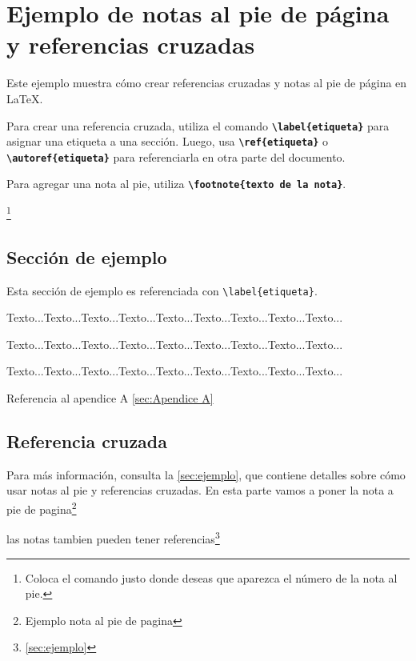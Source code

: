  \section{Ejemplo de notas al pie de página y referencias cruzadas}

 Este ejemplo muestra cómo crear referencias cruzadas y notas al pie de página en \LaTeX.
 
 Para crear una referencia cruzada, utiliza el comando \textbf{\texttt{\textbackslash label\{etiqueta\}}}
 para asignar una etiqueta a una sección. Luego, usa \textbf{\texttt{\textbackslash ref\{etiqueta\}}} o 
 \textbf{\texttt{\textbackslash autoref\{etiqueta\}}} para referenciarla en otra parte del documento.
 
 Para agregar una nota al pie, utiliza \textbf{\texttt{\textbackslash footnote\{texto de la nota\}}}.
 
 

\footnote{Coloca el comando justo donde deseas que aparezca el número de la nota al pie.}
 
 \subsection{Sección de ejemplo} 

 \label{sec:ejemplo}%
 Esta sección de ejemplo es referenciada con \texttt{\textbackslash label\{etiqueta\}}.


 Texto...Texto...Texto...Texto...Texto...Texto...Texto...Texto...Texto...

 Texto...Texto...Texto...Texto...Texto...Texto...Texto...Texto...Texto...

 Texto...Texto...Texto...Texto...Texto...Texto...Texto...Texto...Texto...

 Referencia al apendice A \autoref{sec:Apendice A}

 \subsection{Referencia cruzada} 
 Para más información, consulta la \autoref{sec:ejemplo}, que contiene detalles sobre cómo usar notas al pie 
 y referencias cruzadas.
 En esta parte vamos a poner la nota a pie de pagina\footnote{Ejemplo nota al pie de pagina}
 
 las notas tambien pueden tener referencias\footnote{\autoref{sec:ejemplo}}

 \clearpage 
 

